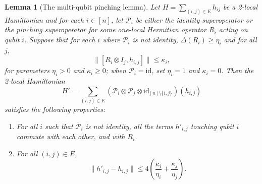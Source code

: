 \documentclass[a4paper,onecolumn,11pt]{quantumarticle}
\theoremstyle{plain}
\newtheorem{lemma}[theorem]{Lemma}
\renewcommand{\cP}{\mathcal{P}}
\begin{document}
\begin{lemma}[The multi-qubit pinching lemma]\label{lemma:double-extra-cheese}
    Let $H = \sum_{(i,j) \in E} h_{ij}$ be a 2-local Hamiltonian and for each $i \in [n]$, let $\mathcal{P}_i$ be either the identity superoperator or the pinching superoperator for some one-local Hermitian operator $R_i$ acting on qubit $i$. Suppose that for each $i$ where $\mathcal{P}_i$ is not identity, $\Delta(R_i) \geq \eta_i$ and for all $j$, 
    \[ \|[R_i \otimes I_j, h_{i,j} ] \| \leq \kappa_i,\]
    for parameters $\eta_i>0$ and $\kappa_i\geq 0$; when $\mathcal{P}_i=\mathrm{id}$, set $\eta_i=1$ and $\kappa_i=0$.
    Then the 2-local Hamiltonian
    \begin{equation}\label{eqn:definition-of-H-prime}
        H' = \sum_{(i,j) \in E} (\cP_i \otimes \cP_j \otimes \mathrm{id}_{[n]\setminus \{i,j\}})( h_{i,j})
    \end{equation}
    satisfies the following properties:
    \begin{enumerate}
        \item For all $i$ such that $\cP_i$ is not identity, all the terms $h'_{i,j}$ touching qubit $i$ commute with each other, and with $R_i$.
        \item For all $(i,j) \in E$,
        \begin{equation} \| h'_{i,j} - h_{i,j} \| \leq 4 \left(\frac{\kappa_i}{\eta_i} +  \frac{\kappa_j}{\eta_j}\right). \label{eq:cheese-rounding-error} \end{equation}
    \end{enumerate}
\end{lemma}
\end{document}
